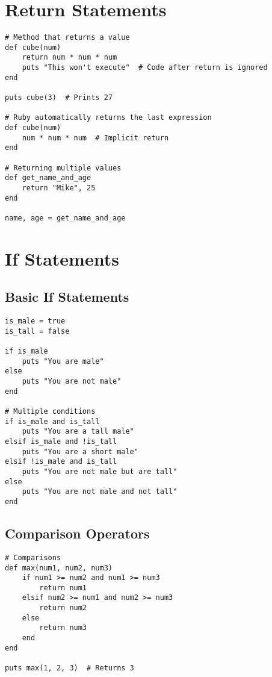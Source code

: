 \documentclass[12pt,a4paper]{article}
\begin{document}
\section{Return Statements}

\begin{lstlisting}
# Method that returns a value
def cube(num)
    return num * num * num
    puts "This won't execute"  # Code after return is ignored
end

puts cube(3)  # Prints 27

# Ruby automatically returns the last expression
def cube(num)
    num * num * num  # Implicit return
end

# Returning multiple values
def get_name_and_age
    return "Mike", 25
end

name, age = get_name_and_age
\end{lstlisting}

\section{If Statements}

\subsection{Basic If Statements}

\begin{lstlisting}
is_male = true
is_tall = false

if is_male
    puts "You are male"
else
    puts "You are not male"
end

# Multiple conditions
if is_male and is_tall
    puts "You are a tall male"
elsif is_male and !is_tall
    puts "You are a short male"
elsif !is_male and is_tall
    puts "You are not male but are tall"
else
    puts "You are not male and not tall"
end
\end{lstlisting}

\subsection{Comparison Operators}

\begin{lstlisting}
# Comparisons
def max(num1, num2, num3)
    if num1 >= num2 and num1 >= num3
        return num1
    elsif num2 >= num1 and num2 >= num3
        return num2
    else
        return num3
    end
end

puts max(1, 2, 3)  # Returns 3
\end{lstlisting}
\end{document}
